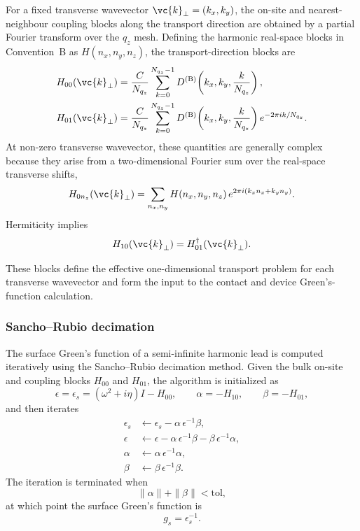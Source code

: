For a fixed transverse wavevector
$\vc{k}_\perp = (k_x,k_y)$, the on-site and nearest-neighbour coupling
blocks along the transport direction are obtained by a partial Fourier
transform over the $q_z$ mesh.  Defining the harmonic real-space blocks
in Convention~B as $H(n_x,n_y,n_z)$, the transport-direction blocks are
\begin{align}
  H_{00}(\vc{k}_\perp)
    &= \frac{C}{N_{q_z}}
       \sum_{k=0}^{N_{q_z}-1}
       D^{(\mathrm{B})}\!\left(k_x, k_y, \frac{k}{N_{q_z}}\right),
  \label{eq:H00} \\
  H_{01}(\vc{k}_\perp)
    &= \frac{C}{N_{q_z}}
       \sum_{k=0}^{N_{q_z}-1}
       D^{(\mathrm{B})}\!\left(k_x, k_y, \frac{k}{N_{q_z}}\right)
       e^{-2\pi i k / N_{q_z}}.
  \label{eq:H01}
\end{align}
At non-zero transverse wavevector, these quantities are generally
complex because they arise from a two-dimensional Fourier sum over the
real-space transverse shifts,
\begin{equation}
  H_{0n_z}(\vc{k}_\perp)
  = \sum_{n_x,n_y}
    H(n_x,n_y,n_z)\,e^{2\pi i(k_x n_x + k_y n_y)}.
\end{equation}
Hermiticity implies
\begin{equation}
  H_{10}(\vc{k}_\perp) = H_{01}^\dagger(\vc{k}_\perp).
\end{equation}

These blocks define the effective one-dimensional transport problem for
each transverse wavevector and form the input to the contact and device
Green's-function calculation.

\subsubsection{Sancho--Rubio decimation}

The surface Green's function of a semi-infinite harmonic lead is
computed iteratively using the Sancho--Rubio decimation method.  Given
the bulk on-site and coupling blocks $H_{00}$ and $H_{01}$, the
algorithm is initialized as
\begin{equation}
  \epsilon = \epsilon_s = (\omega^2 + i\eta)I - H_{00},
  \qquad
  \alpha = -H_{10},
  \qquad
  \beta = -H_{01},
\end{equation}
and then iterates
\begin{align}
  \epsilon_s &\leftarrow \epsilon_s - \alpha\,\epsilon^{-1}\beta, \\
  \epsilon   &\leftarrow \epsilon - \alpha\,\epsilon^{-1}\beta
              - \beta\,\epsilon^{-1}\alpha, \\
  \alpha     &\leftarrow \alpha\,\epsilon^{-1}\alpha, \\
  \beta      &\leftarrow \beta\,\epsilon^{-1}\beta.
\end{align}
The iteration is terminated when
\begin{equation}
  \|\alpha\| + \|\beta\| < \mathrm{tol},
\end{equation}
at which point the surface Green's function is
\begin{equation}
  g_s = \epsilon_s^{-1}.
\end{equation}

